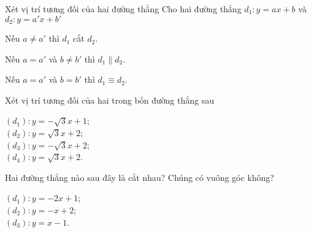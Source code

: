 \begin{dang}{Xét vị trí tương đối của hai đường thẳng}
Cho hai đường thẳng $d_1\colon y=ax+b$ và $d_2\colon y=a'x+b'$
\begin{enumEX}{1}
	\item Nếu $a\neq a'$ thì $d_1$ cắt $d_2$.
	\item Nếu $a=a'$ và $b\neq b'$ thì $d_1\parallel d_2$.
	\item Nếu $a=a'$ và $b=b'$ thì $d_1\equiv d_2$.
\end{enumEX}	
\end{dang}
\begin{vd}
	Xét vị trí tương đối của hai trong bốn đường thẳng sau
	\begin{multicols}{2}
		$(d_1)\colon y=-\sqrt{3}x+1$;\\
		$(d_2)\colon y=\sqrt{3}x+2$;\\
		$(d_3)\colon y=-\sqrt{3}x+2$;\\
		$(d_4)\colon y=\sqrt{3}x+2$.
	\end{multicols}
\end{vd}
\begin{vd}
	Hai đường thẳng nào sau đây là cắt nhau? Chúng có vuông góc không?
		\begin{multicols}{3}
		$(d_1)\colon y=-2x+1$;\\
		$(d_2)\colon y=-x+2$;\\
		$(d_3)\colon y=x-1$.
		\end{multicols}
\end{vd}
